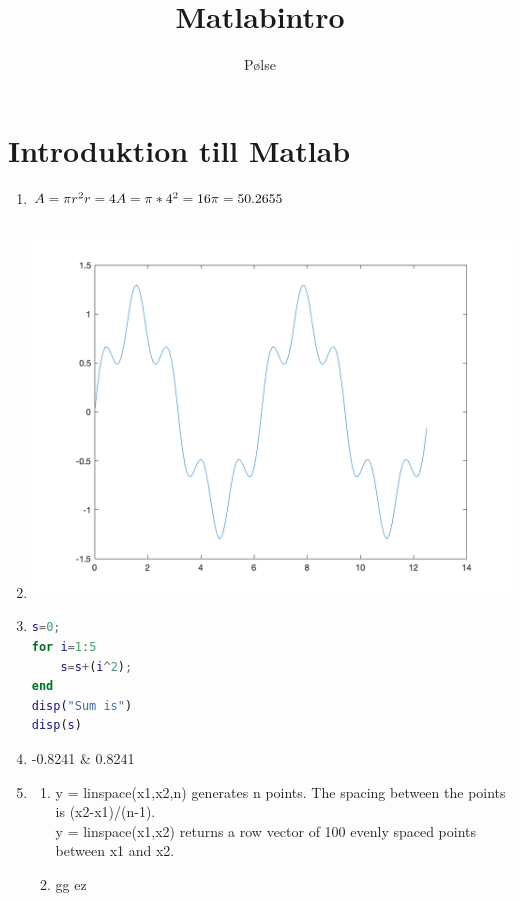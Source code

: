 \documentclass{article}
\title{Matlabintro}
\author{Pølse}
\begin{document}
\maketitle
\tableofcontents
\pagebreak

\section{Introduktion till Matlab}
\begin{enumerate}
\item
\begin{math}
A=\pi r^2
\\
r=4
\\
A=\pi*4^2=16\pi=50.2655
\end{math}

\item
\subsection*{}
\includegraphics[scale=0.2]{2.png}

\item
\begin{lstlisting}[language=matlab]
s=0;
for i=1:5
    s=s+(i^2);
end
disp("Sum is")
disp(s)
\end{lstlisting}

\item
-0.8241 \& 0.8241

\item
\begin{enumerate}
\item
y = linspace(x1,x2,n) generates n points. The spacing between the points is (x2-x1)/(n-1). \\
y = linspace(x1,x2) returns a row vector of 100 evenly spaced points between x1 and x2.

\item
gg ez

\end{enumerate}

\end{enumerate}
\end{document}
